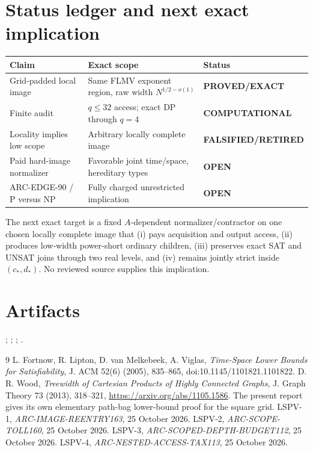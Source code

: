 \documentclass[11pt]{article}
\newcommand{\OPEN}{\textbf{OPEN}}
\begin{document}
\section{Status ledger and next exact implication}
\begin{center}
\begin{tabularx}{.96\linewidth}{p{.27\linewidth}X p{.19\linewidth}}
\toprule
Claim & Exact scope & Status\\
\midrule
Grid-padded local image & Same FLMV exponent region, raw width
$N^{1/2-o(1)}$ & \textbf{PROVED/EXACT}\\
Finite audit & $q\le32$ access; exact DP through $q=4$ &
\textbf{COMPUTATIONAL}\\
Locality implies low scope & Arbitrary locally complete image &
\textbf{FALSIFIED/RETIRED}\\
Paid hard-image normalizer & Favorable joint time/space, hereditary types &
\OPEN\\
ARC-EDGE-90 / P versus NP & Fully charged unrestricted implication & \OPEN\\
\bottomrule
\end{tabularx}
\end{center}

The next exact target is a fixed $A$-dependent normalizer/contractor on one
chosen locally complete image that (i) pays acquisition and output access,
(ii) produces low-width power-short ordinary children, (iii) preserves exact
SAT and UNSAT joins through two real levels, and (iv) remains jointly strict
inside $(c_*,d_*)$.  No reviewed source supplies this implication.

\section{Artifacts}
;
;
;
.

\begin{thebibliography}{9}
 L. Fortnow, R. Lipton, D. van Melkebeek, A. Viglas,
\emph{Time-Space Lower Bounds for Satisfiability}, J. ACM 52(6)
(2005), 835--865, doi:10.1145/1101821.1101822.
 D. R. Wood, \emph{Treewidth of Cartesian Products of Highly
Connected Graphs}, J. Graph Theory 73 (2013), 318--321,
\url{https://arxiv.org/abs/1105.1586}.  The present report gives its own
elementary path-bag lower-bound proof for the square grid.
 LSPV-1, \emph{ARC-IMAGE-REENTRY163}, 25 October 2026.
 LSPV-2, \emph{ARC-SCOPE-TOLL160}, 25 October 2026.
 LSPV-3, \emph{ARC-SCOPED-DEPTH-BUDGET112}, 25 October 2026.
 LSPV-4, \emph{ARC-NESTED-ACCESS-TAX113}, 25 October 2026.
\end{thebibliography}
\end{document}
